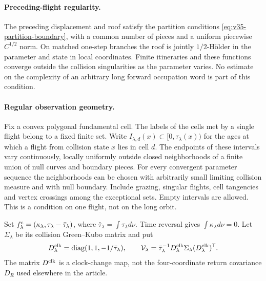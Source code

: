 \paragraph{Preceding-flight regularity.}
The preceding displacement and roof satisfy the partition conditions
\eqref{eq:v35-partition-boundary}, with a common number of pieces and
a uniform piecewise $C^{1/2}$ norm. On matched one-step branches the
roof is jointly $1/2$-H\"older in the parameter and state in local
coordinates. Finite itineraries and these functions converge outside
the collision singularities as the parameter varies. No estimate on
the complexity of an arbitrary long forward occupation word is part
of this condition.

\paragraph{Regular observation geometry.}
Fix a convex polygonal fundamental cell. The labels of the cells met
by a single flight belong to a fixed finite set. Write
$I_{\lambda,d}(x)\subset[0,\tau_\lambda(x))$ for the ages at which a
flight from collision state $x$ lies in cell $d$. The endpoints of
these intervals vary continuously, locally uniformly outside closed
neighborhoods of a finite union of null curves and boundary pieces.
For every convergent parameter sequence the neighborhoods can be
chosen with arbitrarily small limiting collision measure and with
null boundary. Include grazing, singular flights, cell tangencies and
vertex crossings among the exceptional sets. Empty intervals are
allowed. This is a condition on one flight, not on the long orbit.

Set $f^{\rm c}_\lambda=(\kappa_\lambda,
\tau_\lambda-\bar\tau_\lambda)$, where
$\bar\tau_\lambda=\int\tau_\lambda d\nu$. Time reversal gives
$\int\kappa_\lambda d\nu=0$. Let $\Sigma_\lambda$ be its collision
Green--Kubo matrix and put
\begin{equation}\label{eq:v35-family-covariances}
 D^{\rm clk}_\lambda=\operatorname{diag}(1,1,-1/\bar\tau_\lambda),
 \qquad
 \mathcal V_\lambda=\bar\tau_\lambda^{-1}
       D^{\rm clk}_\lambda\Sigma_\lambda(D^{\rm clk}_\lambda)^{\mathsf T}.
\end{equation}
The matrix $D^{\rm clk}$ is a clock-change map, not the four-coordinate
return covariance $D_R$ used elsewhere in the article.

